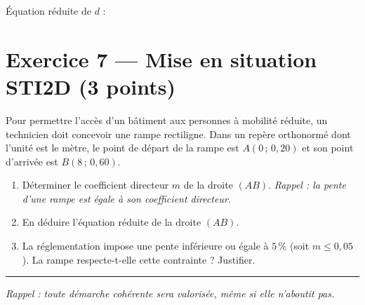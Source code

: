 \documentclass[11pt,a4paper]{article}
\begin{document}
\vspace{-4pt}
\noindent\small Équation réduite de $d$ : \dotfill

\vspace{4pt}

\section*{Exercice 7 — Mise en situation STI2D \hfill \normalsize (3 points)}

\noindent\small Pour permettre l'accès d'un bâtiment aux personnes à mobilité réduite,
un technicien doit concevoir une rampe rectiligne. Dans un repère orthonormé dont
l'unité est le mètre, le point de départ de la rampe est $A(0\,;\,0{,}20)$ et
son point d'arrivée est $B(8\,;\,0{,}60)$.

\begin{enumerate}[label=\textbf{\arabic*.}, leftmargin=18pt]
  \item Déterminer le coefficient directeur $m$ de la droite $(AB)$.
        \emph{Rappel : la pente d'une rampe est égale à son coefficient directeur.}
  \item En déduire l'équation réduite de la droite $(AB)$.
  \item La réglementation impose une pente inférieure ou égale à $5\,\%$
        (soit $m \leq 0{,}05$). La rampe respecte-t-elle cette contrainte ? Justifier.
\end{enumerate}

\vspace{4pt}
\hrule
\vspace{2pt}
\noindent\itshape\small
Rappel : toute démarche cohérente sera valorisée, même si elle n'aboutit pas.
\end{document}
